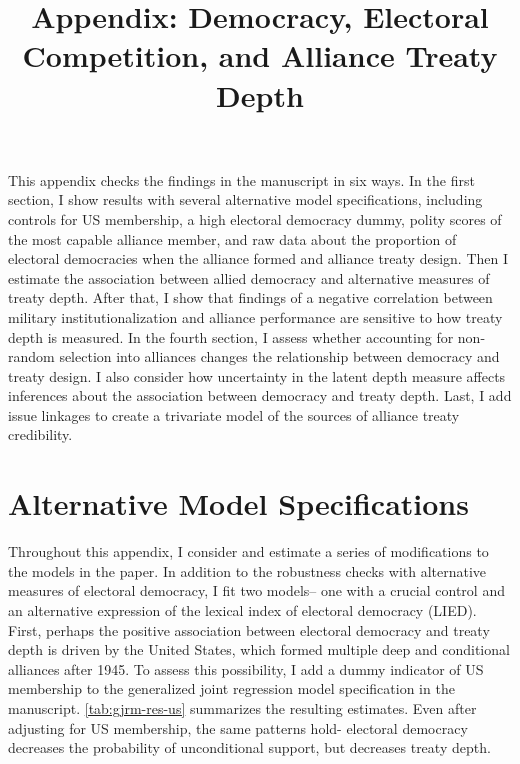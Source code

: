 \documentclass[12pt]{article}
\title{\textbf{Appendix: Democracy, Electoral Competition, and Alliance Treaty Depth}}
\author{}
\date{}
\begin{document}
\maketitle 

\doublespace 

This appendix checks the findings in the manuscript in six ways. 
In the first section, I show results with several alternative model specifications, including controls for US membership, a high electoral democracy dummy, polity scores of the most capable alliance member, and raw data about the proportion of electoral democracies when the alliance formed and alliance treaty design.
Then I estimate the association between allied democracy and alternative measures of treaty depth.
After that, I show that findings of a negative correlation between military institutionalization and alliance performance are sensitive to how treaty depth is measured. 
In the fourth section, I assess whether accounting for non-random selection into alliances changes the relationship between democracy and treaty design.   
I also consider how uncertainty in the latent depth measure affects inferences about the association between democracy and treaty depth. 
Last, I add issue linkages to create a trivariate model of the sources of alliance treaty credibility. 


\section{Alternative Model Specifications} 


Throughout this appendix, I consider and estimate a series of modifications to the models in the paper.
In addition to the robustness checks with alternative measures of electoral democracy, I fit two models-- one with a crucial control and an alternative expression of the lexical index of electoral democracy (LIED). 
First, perhaps the positive association between electoral democracy and treaty depth is driven by the United States, which formed multiple deep and conditional alliances after 1945. 
To assess this possibility, I add a dummy indicator of US membership to the generalized joint regression model specification in the manuscript. 
\autoref{tab:gjrm-res-us} summarizes the resulting estimates. 
Even after adjusting for US membership, the same patterns hold- electoral democracy decreases the probability of unconditional support, but decreases treaty depth. 
 
\end{document}
